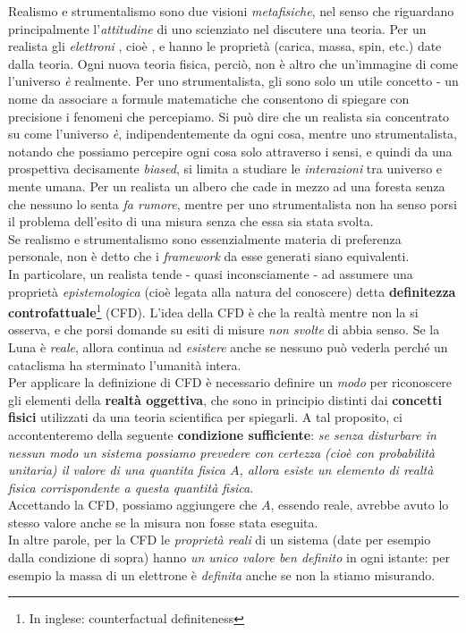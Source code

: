 \documentclass[../../FisicaTeorica.tex]{subfiles}
\begin{document}
Realismo e strumentalismo sono due visioni \textit{metafisiche}, nel senso che riguardano principalmente l'\textit{attitudine} di uno scienziato nel discutere una teoria. Per un realista gli \textit{elettroni} , cioè , e hanno le proprietà (carica, massa, spin, etc.) date dalla teoria. Ogni nuova teoria fisica, perciò, non è altro che un'immagine  di come l'universo \textit{è} realmente. Per uno strumentalista, gli  sono solo un utile concetto - un nome da associare a formule matematiche che consentono di spiegare con precisione i fenomeni che percepiamo. Si può dire che un realista sia concentrato su come l'universo \textit{è}, indipendentemente da ogni cosa, mentre uno strumentalista, notando che possiamo percepire ogni cosa solo attraverso i sensi, e quindi da una prospettiva decisamente \textit{biased}, si limita a studiare le \textit{interazioni} tra universo e mente umana. Per un realista un albero che cade in mezzo ad una foresta senza che nessuno lo senta \textit{fa rumore}, mentre per uno strumentalista non ha senso porsi il problema dell'esito di una misura senza che essa sia stata svolta.\\

Se realismo e strumentalismo sono essenzialmente materia di preferenza personale, non è detto che i \textit{framework} da esse generati siano equivalenti.\\
In particolare, un realista tende - quasi inconsciamente - ad assumere una proprietà \textit{epistemologica} (cioè legata alla natura del conoscere) detta \textbf{definitezza controfattuale}\footnote{In inglese: counterfactual definiteness} (CFD). L'idea della CFD è che la realtà  mentre non la si osserva, e che porsi domande su esiti di misure \textit{non svolte} di  abbia senso. Se la Luna è \textit{reale}, allora continua ad \textit{esistere} anche se nessuno può vederla perché un cataclisma ha sterminato l'umanità intera.\\

Per applicare la definizione di CFD è necessario definire un \textit{modo} per riconoscere gli elementi della \textbf{realtà oggettiva}, che sono in principio distinti dai \textbf{concetti fisici} utilizzati da una teoria scientifica per spiegarli. A tal proposito, ci accontenteremo della seguente \textbf{condizione sufficiente}: \textit{se senza disturbare in nessun modo un sistema possiamo prevedere con certezza (cioè con probabilità unitaria) il valore di una quantita fisica $A$, allora esiste un elemento di realtà fisica corrispondente a questa quantità fisica}.\\
Accettando la CFD, possiamo aggiungere che $A$, essendo reale, avrebbe avuto lo stesso valore anche se la misura non fosse stata eseguita.\\
In altre parole, per la CFD le \textit{proprietà reali} di un sistema (date per esempio dalla condizione di sopra) hanno \textit{un unico valore ben definito} in ogni istante: per esempio la massa di un elettrone è \textit{definita} anche se non la stiamo misurando.\\
\end{document}
